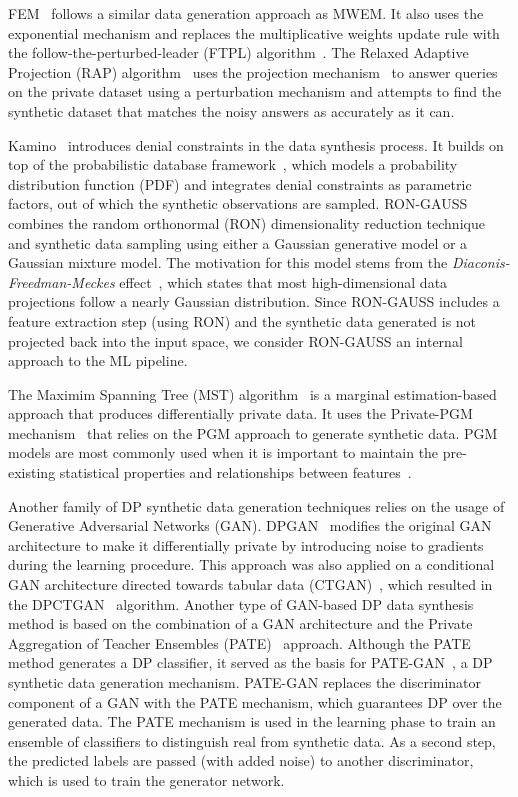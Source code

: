 \documentclass[parskip=full]{scrartcl}
\begin{document}
FEM~\cite{vietri2020new} follows a similar data generation approach as MWEM\@.
It also uses the exponential mechanism and replaces the multiplicative weights
update rule with the follow-the-perturbed-leader (FTPL)
algorithm~\cite{kalai2005efficient}. The Relaxed Adaptive Projection (RAP)
algorithm~\cite{aydore2021differentially} uses the projection
mechanism~\cite{nikolov2013geometry} to answer queries on the private dataset
using a perturbation mechanism and attempts to find the synthetic dataset that
matches the noisy answers as accurately as it can.

Kamino~\cite{ge2021kamino} introduces denial constraints in the data synthesis
process. It builds on top of the probabilistic database
framework~\cite{de2019formal, suciu2011probabilistic}, which models a
probability distribution function (PDF) and integrates denial constraints as
parametric factors, out of which the synthetic observations are sampled.
RON-GAUSS~\cite{chanyaswad2019ron} combines the random orthonormal (RON)
dimensionality reduction technique and synthetic data sampling using either a
Gaussian generative model or a Gaussian mixture model. The motivation for this
model stems from the \textit{Diaconis-Freedman-Meckes}
effect~\cite{meckes2012projections}, which states that most high-dimensional
data projections follow a nearly Gaussian distribution. Since RON-GAUSS
includes a feature extraction step (using RON) and the synthetic data
generated is not projected back into the input space, we consider RON-GAUSS an
internal approach to the ML pipeline.

The Maximim Spanning Tree (MST) algorithm~\cite{mckenna2021winning} is a
marginal estimation-based approach that produces differentially private data.
It uses the Private-PGM mechanism~\cite{mckenna2019graphical} that relies on
the PGM approach to generate synthetic data. PGM models are most commonly used
when it is important to maintain the pre-existing statistical properties and
relationships between features~\cite{young2009using}.

Another family of DP synthetic data generation techniques relies on the usage
of Generative Adversarial Networks (GAN). DPGAN~\cite{xie2018differentially}
modifies the original GAN architecture to make it differentially private by
introducing noise to gradients during the learning procedure. This approach
was also applied on a conditional GAN architecture directed towards tabular
data (CTGAN)~\cite{xu2019modeling}, which resulted in the
DPCTGAN~\cite{rosenblatt2020differentially} algorithm. Another type of
GAN-based DP data synthesis method is based on the combination of a GAN
architecture and the Private Aggregation of Teacher Ensembles
(PATE)~\cite{papernot2017semi} approach. Although the PATE method generates a
DP classifier, it served as the basis for PATE-GAN~\cite{jordon2018pate}, a DP
synthetic data generation mechanism. PATE-GAN replaces the discriminator
component of a GAN with the PATE mechanism, which guarantees DP over the
generated data. The PATE mechanism is used in the learning phase to train an
ensemble of classifiers to distinguish real from synthetic data. As a second
step, the predicted labels are passed (with added noise) to another
discriminator, which is used to train the generator network.
\end{document}
